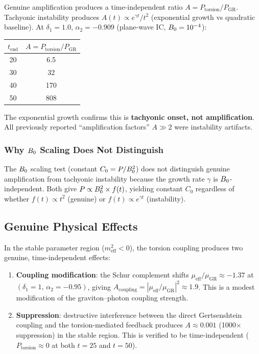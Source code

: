 Genuine amplification produces a time-independent ratio $A = P_{\text{torsion}}/P_{\text{GR}}$. Tachyonic instability produces $A(t) \propto e^{\gamma t}/t^2$ (exponential growth vs quadratic baseline). At $\delta_1 = 1.0$, $\alpha_2 = -0.909$ (plane-wave IC, $B_0 = 10^{-4}$):
\begin{center}
\begin{tabular}{cc}
\toprule
$t_{\text{end}}$ & $A = P_{\text{torsion}}/P_{\text{GR}}$ \\
\midrule
20 & 6.5 \\
30 & 32 \\
40 & 170 \\
50 & 808 \\
\bottomrule
\end{tabular}
\end{center}
The exponential growth confirms this is \textbf{tachyonic onset, not amplification}. All previously reported ``amplification factors'' $A \gg 2$ were instability artifacts.

\subsubsection{Why $B_0$ Scaling Does Not Distinguish}

The $B_0$ scaling test (constant $C_0 = P/B_0^2$) does not distinguish genuine amplification from tachyonic instability because the growth rate $\gamma$ is $B_0$-independent. Both give $P \propto B_0^2 \times f(t)$, yielding constant $C_0$ regardless of whether $f(t) \propto t^2$ (genuine) or $f(t) \propto e^{\gamma t}$ (instability).

\subsection{Genuine Physical Effects}
\label{subsec:genuine-effects}

In the stable parameter region ($m^2_{\text{eff}} < 0$), the torsion coupling produces two genuine, time-independent effects:
\begin{enumerate}
  \item \textbf{Coupling modification}: the Schur complement shifts $\mu_{\text{eff}}/\mu_{\text{GR}} \approx -1.37$ at $(\delta_1 = 1,\, \alpha_2 = -0.95)$, giving $A_{\text{coupling}} = |\mu_{\text{eff}}/\mu_{\text{GR}}|^2 \approx 1.9$. This is a modest modification of the graviton--photon coupling strength.
  \item \textbf{Suppression}: destructive interference between the direct Gertsenshtein coupling and the torsion-mediated feedback produces $A \approx 0.001$ (1000$\times$ suppression) in the stable region. This is verified to be time-independent ($P_{\text{torsion}} \approx 0$ at both $t = 25$ and $t = 50$).
\end{enumerate}

